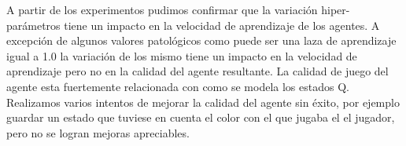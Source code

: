 A partir de los experimentos pudimos confirmar que la variación hiper-parámetros tiene un impacto en la velocidad de aprendizaje de los agentes. A excepción de algunos valores patológicos como puede ser una laza de aprendizaje igual a 1.0 la variación de los mismo tiene un impacto en la velocidad de aprendizaje pero no en la calidad del agente resultante. La calidad de juego del agente esta fuertemente relacionada con como se modela los estados Q. Realizamos varios intentos de mejorar la calidad del agente sin éxito, por ejemplo guardar un estado que tuviese en cuenta el color con el que jugaba el el jugador, pero no se logran mejoras apreciables.  